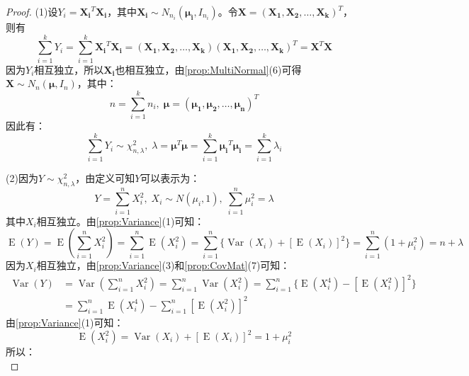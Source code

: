 \begin{proof}
	(1)设$Y_i=\mathbf{X_i}^T\mathbf{X_i}$，其中$\mathbf{X_i}\sim N_{n_i}(\boldsymbol{\mu_i},I_{n_i})$。令$\mathbf{X}=(\mathbf{X_1},\mathbf{X_2},\dots,\mathbf{X_k})^T$，则有
	\begin{equation*}
		\sum_{i=1}^{k}Y_i=\sum_{i=1}^{k}\mathbf{X_i}^T\mathbf{X_i}=(\mathbf{X_1},\mathbf{X_2},\dots,\mathbf{X_k})(\mathbf{X_1},\mathbf{X_2},\dots,\mathbf{X_k})^T=\mathbf{X}^T\mathbf{X}
	\end{equation*}
	因为$Y_i$相互独立，所以$\mathbf{X_i}$也相互独立，由\cref{prop:MultiNormal}(6)可得$\mathbf{X}\sim N_n(\boldsymbol{\mu},I_n)$，其中：
	\begin{equation*}
		n=\sum_{i=1}^{k}n_i,\;\boldsymbol{\mu}=(\boldsymbol{\mu_1},\boldsymbol{\mu_2},\dots,\boldsymbol{\mu_n})^T
	\end{equation*}
	因此有：
	\begin{equation*}
		\sum_{i=1}^{k}Y_i\sim\chi_{n,\lambda}^2,\;\lambda=\boldsymbol{\mu}^T\boldsymbol{\mu}=\sum_{i=1}^{k}\boldsymbol{\mu_i}^T\boldsymbol{\mu_i}=\sum_{i=1}^{k}\lambda_i
	\end{equation*}\par
	(2)因为$Y\sim\chi_{n,\lambda}^2$，由定义可知$Y$可以表示为：
	\begin{equation*}
		Y=\sum_{i=1}^{n}X_i^2,\;X_i\sim N(\mu_i,1),\;\sum_{i=1}^{n}\mu_i^2=\lambda
	\end{equation*}
	其中$X_i$相互独立。由\cref{prop:Variance}(1)可知：
	\begin{equation*}
		\operatorname{E}(Y)=\operatorname{E}\left(\sum_{i=1}^{n}X_i^2\right)=\sum_{i=1}^{n}\operatorname{E}(X_i^2)=\sum_{i=1}^{n}\{\operatorname{Var}(X_i)+[\operatorname{E}(X_i)]^2\}=\sum_{i=1}^{n}(1+\mu_i^2)=n+\lambda
	\end{equation*}
	因为$X_i$相互独立，由\cref{prop:Variance}(3)和\cref{prop:CovMat}(7)可知：
	\begin{align*}
		\operatorname{Var}(Y)
		&=\operatorname{Var}\left(\sum_{i=1}^{n}X_i^2\right)=\sum_{i=1}^{n}\operatorname{Var}(X_i^2)=\sum_{i=1}^{n}\{\operatorname{E}(X_i^4)-[\operatorname{E}(X_i^2)]^2\} \\
		&=\sum_{i=1}^{n}\operatorname{E}(X_i^4)-\sum_{i=1}^{n}[\operatorname{E}(X_i^2)]^2
	\end{align*}
	由\cref{prop:Variance}(1)可知：
	\begin{equation*}
		\operatorname{E}(X_i^2)=\operatorname{Var}(X_i)+[\operatorname{E}(X_i)]^2=1+\mu_i^2
	\end{equation*}
	所以：
	\begin{equation*}

\end{equation*}
\end{proof}

